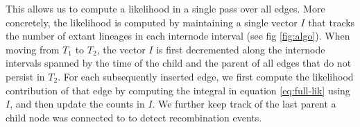 \documentclass{article}
\newcommand{\argweaver}[0]{\texttt{ARGweaver}}
\begin{document}
This allows us to compute a likelihood in a single pass over all edges.
More concretely, the likelihood is computed by maintaining a single vector $I$ that tracks
the number of extant lineages in each internode interval (see fig \ref{fig:algo}).
When moving from $T_1$ to $T_2$, the vector $I$ is first decremented along the internode intervals
spanned by the time of the child and the parent of all edges that do not persist in $T_2$.
For each subsequently inserted edge, we first compute the likelihood contribution
of that edge by computing the integral
in equation \eqref{eq:full-lik} using $I$, and then update the counts in $I$.
We further keep track of
the last parent a child node was connected to to detect recombination events.


\end{document}

